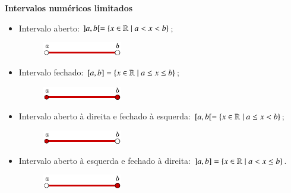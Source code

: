 \textbf{Intervalos numéricos limitados}
\begin{itemize}
 \item Intervalo aberto: $]a, b[= \{x \in \mathbb{R} \mid a < x < b\}$;
 \begin{figure}[H]
 \centering
 \includegraphics[width=3.5cm]{../Topicos/Figuras/aberto-a-aberto-b.pdf}
 \end{figure}
 \item Intervalo fechado: $[a, b]= \{x \in \mathbb{R} \mid a \leq x \leq b\}$;
 \begin{figure}[H]
 \centering
 \includegraphics[width=3.5cm]{../Topicos/Figuras/fechado-a-fechado-b.pdf}
 \end{figure}
 \item Intervalo aberto à direita e fechado à esquerda: $[a, b[= \{x \in \mathbb{R} \mid a \leq x < b\}$;
 \begin{figure}[H]
 \centering
 \includegraphics[width=3.5cm]{../Topicos/Figuras/fechado-a-aberto-b.pdf}
 \end{figure}
 \item Intervalo aberto à esquerda e fechado à direita: $]a, b]= \{x \in \mathbb{R} \mid a < x \leq b\}$.
 \begin{figure}[H]
 \centering
 \includegraphics[width=3.5cm]{../Topicos/Figuras/aberto-a-fechado-b.pdf}
 \end{figure}
\end{itemize}



